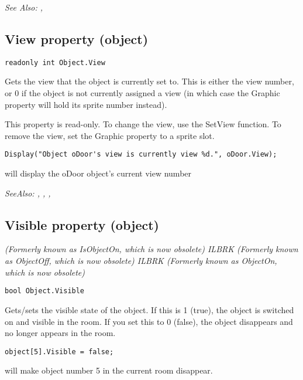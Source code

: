 \it{See Also:} ,


\subsection{View property (object)}\label{Object.View}%

\begin{verbatim}
readonly int Object.View
\end{verbatim}
Gets the view that the object is currently set to. This is either the view number, or 0
if the object is not currently assigned a view (in which case the Graphic property will
hold its sprite number instead).

This property is read-only. To change the view, use the SetView function. To remove
the view, set the Graphic property to a sprite slot.

\begin{verbatim}
Display("Object oDoor's view is currently view %d.", oDoor.View);
\end{verbatim}
will display the oDoor object's current view number

\it{SeeAlso:} ,
, ,


\subsection{Visible property (object)}\label{Object.Visible}%

\it{(Formerly known as IsObjectOn, which is now obsolete)} ILBRK
\it{(Formerly known as ObjectOff, which is now obsolete)} ILBRK
\it{(Formerly known as ObjectOn, which is now obsolete)}

\begin{verbatim}
bool Object.Visible
\end{verbatim}
Gets/sets the visible state of the object. If this is 1 (true), the object is switched on
and visible in the room. If you set this to 0 (false), the object disappears and no longer
appears in the room.

\begin{verbatim}
object[5].Visible = false;
\end{verbatim}
will make object number 5 in the current room disappear.


